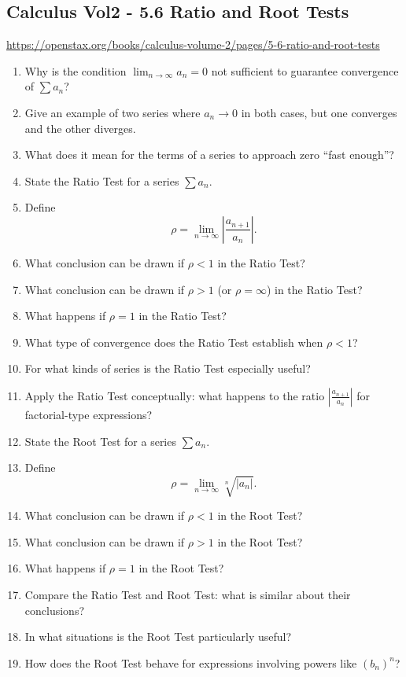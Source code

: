 \subsection{Calculus Vol2 - 5.6 Ratio and Root Tests}

\url{https://openstax.org/books/calculus-volume-2/pages/5-6-ratio-and-root-tests}

\begin{enumerate}
  \item Why is the condition $\lim_{n\to\infty} a_n = 0$ not sufficient to guarantee convergence of $\sum a_n$?
  \item Give an example of two series where $a_n \to 0$ in both cases, but one converges and the other diverges.
  \item What does it mean for the terms of a series to approach zero “fast enough”?
  \item State the Ratio Test for a series $\sum a_n$.
  \item Define
    \[
      \rho = \lim_{n\to\infty} \left| \frac{a_{n+1}}{a_n} \right|.
    \]
  \item What conclusion can be drawn if $\rho < 1$ in the Ratio Test?
  \item What conclusion can be drawn if $\rho > 1$ (or $\rho = \infty$) in the Ratio Test?
  \item What happens if $\rho = 1$ in the Ratio Test?
  \item What type of convergence does the Ratio Test establish when $\rho < 1$?
  \item For what kinds of series is the Ratio Test especially useful?
  \item Apply the Ratio Test conceptually: what happens to the ratio $\left|\frac{a_{n+1}}{a_n}\right|$ for factorial-type expressions?
  \item State the Root Test for a series $\sum a_n$.
  \item Define
    \[
      \rho = \lim_{n\to\infty} \sqrt[n]{|a_n|}.
    \]
  \item What conclusion can be drawn if $\rho < 1$ in the Root Test?
  \item What conclusion can be drawn if $\rho > 1$ in the Root Test?
  \item What happens if $\rho = 1$ in the Root Test?
  \item Compare the Ratio Test and Root Test: what is similar about their conclusions?
  \item In what situations is the Root Test particularly useful?
  \item How does the Root Test behave for expressions involving powers like $(b_n)^n$?

\end{enumerate}
